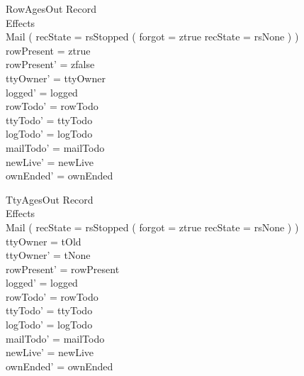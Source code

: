 \documentclass[a4paper,10pt,fleqn]{article}
\begin{document}
\begin{schema}{RowAgesOut}
  \Xi Record \\
  \Delta Effects \\
  \Xi Mail
  \where
  ( recState = rsStopped \lor ( forgot = ztrue \land recState = rsNone ) ) \\
  rowPresent = ztrue \\
  rowPresent' = zfalse \\
  ttyOwner' = ttyOwner \\
  logged' = logged \\
  rowTodo' = rowTodo \\
  ttyTodo' = ttyTodo \\
  logTodo' = logTodo \\
  mailTodo' = mailTodo \\
  newLive' = newLive \\
  ownEnded' = ownEnded
\end{schema}

\begin{schema}{TtyAgesOut}
  \Xi Record \\
  \Delta Effects \\
  \Xi Mail
  \where
  ( recState = rsStopped \lor ( forgot = ztrue \land recState = rsNone ) ) \\
  ttyOwner = tOld \\
  ttyOwner' = tNone \\
  rowPresent' = rowPresent \\
  logged' = logged \\
  rowTodo' = rowTodo \\
  ttyTodo' = ttyTodo \\
  logTodo' = logTodo \\
  mailTodo' = mailTodo \\
  newLive' = newLive \\
  ownEnded' = ownEnded
\end{schema}
\end{document}
